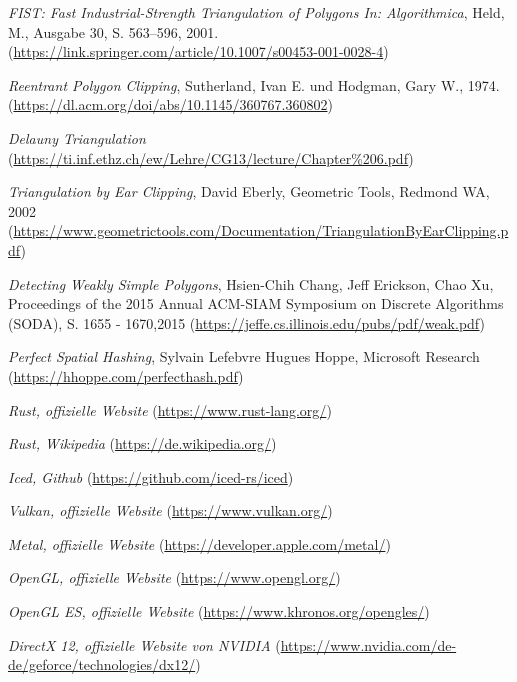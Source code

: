 \begin{thebibliography}{11}
    \emph{FIST: Fast Industrial-Strength Triangulation of Polygons In: Algorithmica}, Held, M., Ausgabe 30, S. 563–596, 2001.
    (\href{https://link.springer.com/article/10.1007/s00453-001-0028-4}{https://link.springer.com/article/10.1007/s00453-001-0028-4})
    
    \emph{Reentrant Polygon Clipping}, Sutherland, Ivan E. und Hodgman, Gary W., 1974. \break
    (\href{https://dl.acm.org/doi/abs/10.1145/360767.360802}{https://dl.acm.org/doi/abs/10.1145/360767.360802})

    \emph{Delauny Triangulation} \break
    (\href{https://ti.inf.ethz.ch/ew/Lehre/CG13/lecture/Chapter%206.pdf}{https://ti.inf.ethz.ch/ew/Lehre/CG13/lecture/Chapter\%206.pdf})

    \emph{Triangulation by Ear Clipping}, David Eberly, Geometric Tools, Redmond WA, 2002 \break
    (\href{https://www.geometrictools.com/Documentation/TriangulationByEarClipping.pdf}{https://www.geometrictools.com/Documentation/TriangulationByEarClipping.pdf})

    \emph{Detecting Weakly Simple Polygons}, Hsien-Chih Chang, Jeff Erickson, Chao Xu, Proceedings of the 2015 Annual ACM-SIAM Symposium on Discrete Algorithms (SODA), S. 1655 - 1670,2015\break
    (\href{https://jeffe.cs.illinois.edu/pubs/pdf/weak.pdf}{https://jeffe.cs.illinois.edu/pubs/pdf/weak.pdf})

    \emph{Perfect Spatial Hashing}, Sylvain Lefebvre Hugues Hoppe, Microsoft Research
    (\href{https://hhoppe.com/perfecthash.pdf}{https://hhoppe.com/perfecthash.pdf})

    \emph{Rust, offizielle Website} \break
    (\href{https://www.rust-lang.org/}{https://www.rust-lang.org/})

    \emph{Rust, Wikipedia} \break
    (\href{https://de.wikipedia.org/wiki/Rust_(Programmiersprache)}{https://de.wikipedia.org/})

    \emph{Iced, Github} \break
    (\href{https://github.com/iced-rs/iced}{https://github.com/iced-rs/iced})

    \emph{Vulkan, offizielle Website} \break
    (\href{https://www.vulkan.org/}{https://www.vulkan.org/})

    \emph{Metal, offizielle Website} \break
    (\href{https://developer.apple.com/metal/}{https://developer.apple.com/metal/})

    \emph{OpenGL, offizielle Website} \break
    (\href{https://www.opengl.org/}{https://www.opengl.org/})

    \emph{OpenGL ES, offizielle Website} \break
    (\href{https://www.khronos.org/opengles/}{https://www.khronos.org/opengles/})

    \emph{DirectX 12, offizielle Website von NVIDIA} \break
    (\href{https://www.nvidia.com/de-de/geforce/technologies/dx12/}{https://www.nvidia.com/de-de/geforce/technologies/dx12/})
\end{thebibliography}